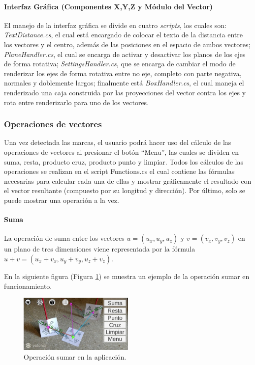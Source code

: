 \paragraph{Interfaz Gráfica (Componentes X,Y,Z y Módulo del Vector)}
El manejo de la interfaz gráfica se divide en cuatro \textit{scripts}, los cuales son: \textit{TextDistance.cs}, el cual está encargado de colocar el texto de la distancia entre los vectores y el centro, además de las posiciones en el espacio de ambos vectores; \textit{PlaneHandler.cs}, el cual se encarga de activar y desactivar los planos de los ejes de forma rotativa; \textit{SettingsHandler.cs}, que se encarga de cambiar el modo de renderizar los ejes de forma rotativa entre no eje, completo con parte negativa, normales y doblemente largos; finalmente está \textit{BoxHandler.cs}, el cual maneja el renderizado una caja construida por las proyecciones del vector contra los ejes y rota entre renderizarlo para uno de los vectores.

\subsubsection{Operaciones de vectores}
Una vez detectada las marcas, el usuario podrá hacer uso del cálculo de las operaciones de vectores al presionar el botón “Menu”, las cuales se dividen en suma, resta, producto cruz, producto punto y limpiar. Todos los cálculos de las operaciones se realizan en el script Functions.cs el cual contiene las fórmulas necesarias para calcular cada una de ellas y mostrar gráficamente el resultado con el vector resultante (compuesto por su longitud y dirección). Por último, solo se puede mostrar una operación a la vez.

\paragraph{Suma}
La operación de suma entre los vectores $u=(u_x,u_y,u_z)$ y $v=(v_x,v_y,v_z)$ en un plano de tres dimensiones viene representada por la fórmula $u + v = (u_x+v_x, u_y+v_y, u_z+v_z)$.

En la siguiente figura (Figura \ref{fig:vec_suma}) se muestra un ejemplo de la operación sumar en funcionamiento.

\begin{figure}[hbt!]
\centering
\includegraphics[width=0.5\textwidth]{figuras/vectores/Suma.png}
\caption{\label{fig:vec_suma}Operación sumar en la aplicación.}
\end{figure}
\FloatBarrier

